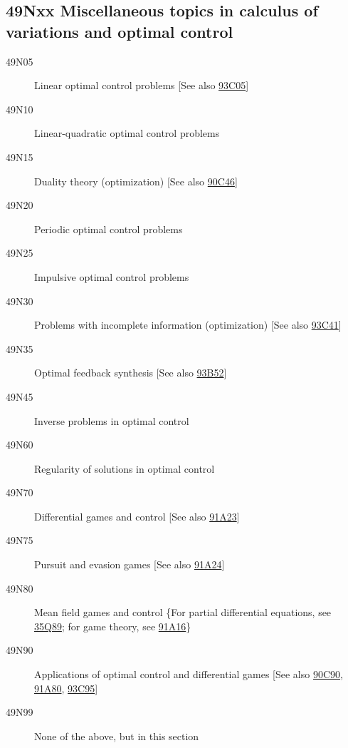 \documentclass[letterpaper]{article}
\begin{document}
\subsection*{49Nxx  Miscellaneous topics in calculus of variations and optimal control }\label{49Nxx}
\begin{description}  
\item [49N05]\label{49N05} Linear optimal control problems [See also \hyperref[93C05]{93C05}]
\item [49N10]\label{49N10} Linear-quadratic optimal control problems
\item [49N15]\label{49N15} Duality theory (optimization) [See also \hyperref[90C46]{90C46}]
\item [49N20]\label{49N20} Periodic optimal control problems
\item [49N25]\label{49N25} Impulsive optimal control problems
\item [49N30]\label{49N30} Problems with incomplete information (optimization) [See also \hyperref[93C41]{93C41}]
\item [49N35]\label{49N35} Optimal feedback synthesis [See also \hyperref[93B52]{93B52}]
\item [49N45]\label{49N45} Inverse problems in optimal control
\item [49N60]\label{49N60} Regularity of solutions in optimal control
\item [49N70]\label{49N70} Differential games and control [See also \hyperref[91A23]{91A23}]
\item [49N75]\label{49N75} Pursuit and evasion games [See also \hyperref[91A24]{91A24}]
\item [49N80]\label{49N80} Mean field games and control \{For partial differential equations, see \hyperref[35Q89]{35Q89}; for game theory, see \hyperref[91A16]{91A16}\}
\item [49N90]\label{49N90} Applications of optimal control and differential games [See also \hyperref[90C90]{90C90}, \hyperref[91A80]{91A80}, \hyperref[93C95]{93C95}]
\item [49N99]\label{49N99} None of the above, but in this section
\end{description}
\end{document}
